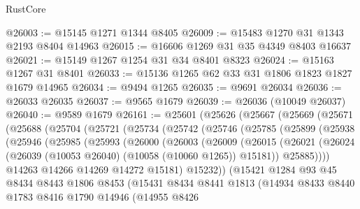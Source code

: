 \begin{lexlean}{RustCore}
\begin{coremodule}
@26003 := @15145 @1271 @1344 @8405
@26009 := @15483 @1270 @31 @1343 @2193 @8404 @14963
@26015 := @16606 @1269 @31 @35 @4349 @8403 @16637
@26021 := @15149 @1267 @1254 @31 @34 @8401 @8323
@26024 := @15163 @1267 @31 @8401
@26033 := @15136 @1265 @62 @33 @31 @1806 @1823 @1827 @1679 @14965
@26034 := @9494 @1265
@26035 := @9691 @26034
@26036 := @26033 @26035
@26037 := @9565 @1679
@26039 := @26036 (@10049 @26037)
@26040 := @9589 @1679
@26161 := @25601
    (@25626
      (@25667
        (@25669
          (@25671
            (@25688
              (@25704
                (@25721
                  (@25734
                    (@25742
                      (@25746
                        (@25785
                          (@25899
                            (@25938
                              (@25946
                                (@25985
                                  (@25993
                                    (@26000
                                      (@26003
                                        (@26009
                                          (@26015
                                            (@26021
                                              (@26024
                                                (@26039
                                                  (@10053 @26040)
                                                  (@10058 (@10060 @1265))
                                                  @15181))
                                              @25885))))
                                      @14263
                                      @14266
                                      @14269
                                      @14272
                                      @15181)
                                    @15232))
                                (@15421
                                  @1284
                                  @93
                                  @45
                                  @8434
                                  @8443
                                  @1806
                                  @8453
                                  (@15431
                                    @8434
                                    @8441
                                    @1813
                                    (@14934
                                      @8433
                                      @8440
                                      @1783
                                      @8416
                                      @1790
                                      @14946
                                      (@14955
                                        @8426

\end{coremodule}
\end{lexlean}
